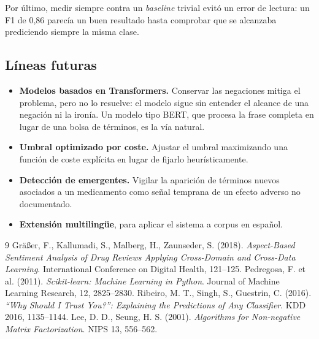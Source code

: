 \documentclass[11pt,a4paper]{article}
\begin{document}
Por último, medir siempre contra un \textit{baseline} trivial evitó un error de
lectura: un F1 de 0,86 parecía un buen resultado hasta comprobar que se
alcanzaba prediciendo siempre la misma clase.

\subsection{Líneas futuras}

\begin{itemize}[nosep,leftmargin=*]
  \item \textbf{Modelos basados en Transformers.} Conservar las negaciones
        mitiga el problema, pero no lo resuelve: el modelo sigue sin entender el
        alcance de una negación ni la ironía. Un modelo tipo BERT, que procesa
        la frase completa en lugar de una bolsa de términos, es la vía natural.
  \item \textbf{Umbral optimizado por coste.} Ajustar el umbral maximizando una
        función de coste explícita en lugar de fijarlo heurísticamente.
  \item \textbf{Detección de emergentes.} Vigilar la aparición de términos
        nuevos asociados a un medicamento como señal temprana de un efecto
        adverso no documentado.
  \item \textbf{Extensión multilingüe}, para aplicar el sistema a corpus en
        español.
\end{itemize}

\begin{thebibliography}{9}\small
{} Gräßer, F., Kallumadi, S., Malberg, H., Zaunseder, S. (2018).
  \textit{Aspect-Based Sentiment Analysis of Drug Reviews Applying Cross-Domain
  and Cross-Data Learning}. International Conference on Digital Health, 121--125.
 Pedregosa, F. et al. (2011). \textit{Scikit-learn:
  Machine Learning in Python}. Journal of Machine Learning Research, 12, 2825--2830.
 Ribeiro, M. T., Singh, S., Guestrin, C. (2016).
  \textit{“Why Should I Trust You?”: Explaining the Predictions of Any
  Classifier}. KDD 2016, 1135--1144.
 Lee, D. D., Seung, H. S. (2001). \textit{Algorithms for
  Non-negative Matrix Factorization}. NIPS 13, 556--562.
\end{thebibliography}

\newpage
\appendix
\renewcommand{\thesection}{\appendixname~\Alph{section}}
\end{document}
